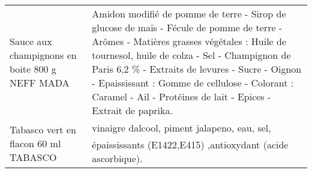 \begin{longtable}{p{5cm}p{10cm}}
                                                           Sauce aux champignons en boite 800 g NEFF MADA &                                                                                                                                                                                                                                                                                                                                                                                                                                                                                                                                                                                                                                                                             Amidon modifié de pomme de terre - Sirop de glucose de maïs - Fécule de pomme de terre - Arômes - Matières grasses végétales : Huile de tournesol, huile de colza - Sel - Champignon de Paris 6,2 \% - Extraits de levures - Sucre - Oignon - Epaississant : Gomme de cellulose - Colorant : Caramel - Ail - Protéines de lait - Epices - Extrait de paprika. \\
                                                                     Tabasco vert en flacon 60 ml TABASCO &                                                                                                                                                                                                                                                                                                                                                                                                                                                                                                                                                                                                                                                                                                                                                                                                                                                                                                                                vinaigre dalcool, piment jalapeno, eau, sel, épaississants (E1422,E415) ,antioxydant (acide ascorbique). \\

\end{longtable}
